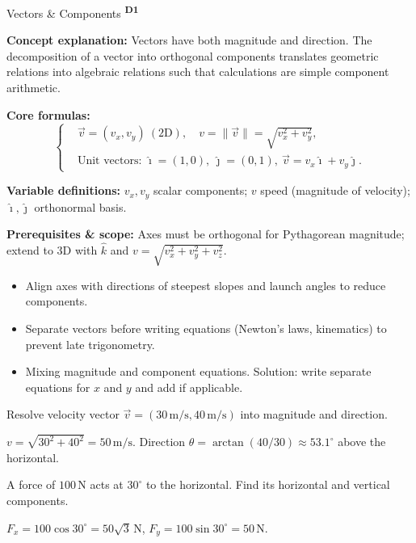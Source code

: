 ﻿\documentclass[12pt,a4paper]{article}
\providecommand{\KPFormulas}{}
\providecommand{\KPHeuristics}{}
\providecommand{\KPProblems}{}
\newcommand{\DOne}{\texorpdfstring{\textsuperscript{\textbf{D1}}}{ D1}}
\begin{document}
\begin{KnowledgePoint}{Vectors \& Components \DOne}
  \KPFormulas
  \begin{formulabox}
  \textbf{Concept explanation:} Vectors have both magnitude and direction. The decomposition of a vector into orthogonal components translates geometric relations into algebraic relations such that calculations are simple component arithmetic.

  \textbf{Core formulas:}
  \[
  \left\{\begin{aligned}
    &\vec v=(v_x,v_y)\ (\text{2D}),\quad v=\|\vec v\|=\sqrt{v_x^2+v_y^2},\\
    &\text{Unit vectors: }\hat\imath=(1,0),\ \hat\jmath=(0,1),\ \vec v=v_x\hat\imath+v_y\hat\jmath.
  \end{aligned}\right.
  \]

  \textbf{Variable definitions:} $v_x,v_y$ scalar components; $v$ speed (magnitude of velocity); $\hat\imath,\hat\jmath$ orthonormal basis.


  \textbf{Prerequisites \& scope:} Axes must be orthogonal for Pythagorean magnitude; extend to 3D with $\hat k$ and $v=\sqrt{v_x^2+v_y^2+v_z^2}$.
  \end{formulabox}

  \KPHeuristics
  \begin{heuristicsbox}
  \begin{itemize}[leftmargin=*]
    \item Align axes with directions of steepest slopes and launch angles to reduce components.
    \item Separate vectors before writing equations (Newton's laws, kinematics) to prevent late trigonometry.
  \end{itemize}
  \vspace{0.4em}
  \begin{itemize}[leftmargin=*]
    \item Mixing magnitude and component equations. Solution: write separate equations for $x$ and $y$ and add if applicable.
  \end{itemize}
  \end{heuristicsbox}

  \KPProblems
\begin{cheatproblem}
  Resolve velocity vector $\vec v=(30\,\text{m/s},40\,\text{m/s})$ into magnitude and direction.
\begin{solutionbox}
  $v=\sqrt{30^2+40^2}=50\,\text{m/s}$. Direction $\theta=\arctan(40/30)\approx53.1^\circ$ above the horizontal.
\end{solutionbox}
\end{cheatproblem}
\begin{cheatproblem}
  A force of $100\,\text{N}$ acts at $30^\circ$ to the horizontal. Find its horizontal and vertical components.
\begin{solutionbox}
  $F_x=100\cos30^\circ=50\sqrt3\,\text{N}$, $F_y=100\sin30^\circ=50\,\text{N}$.
\end{solutionbox}
\end{cheatproblem}
\end{KnowledgePoint}
\end{document}
